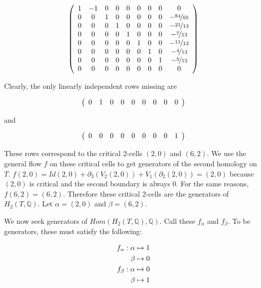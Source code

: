 \documentclass{amsart}
\newcommand{\bq}{\ensuremath{\mathbb{Q}}} %
\begin{document}
\bigskip

$$
\left(
\begin{array}{*{9}c}
1 & -1 & 0 & 0 & 0 & 0 & 0 & 0 & 0\\
0 & 0 & 1 & 0 & 0 & 0 & 0 & 0 & -\nicefrac{84}{65}\\
0 & 0 & 0 & 1 & 0 & 0 & 0 & 0 & -\nicefrac{21}{13}\\
0 & 0 & 0 & 0 & 1 & 0 & 0 & 0 & -\nicefrac{7}{13}\\
0 & 0 & 0 & 0 & 0 & 1 & 0 & 0 & -\nicefrac{11}{13}\\
0 & 0 & 0 & 0 & 0 & 0 & 1 & 0 & -\nicefrac{4}{13}\\
0 & 0 & 0 & 0 & 0 & 0 & 0 & 1 & -\nicefrac{5}{13}\\
0 & 0 & 0 & 0 & 0 & 0 & 0 & 0 & 0\\
\end{array}
\right)
$$
\bigskip

Clearly, the only linearly independent rows missing are 

$$
\left(
\begin{array}{*{9}c}
0 & 1 & 0 & 0 & 0 & 0 & 0 & 0 & 0
\end{array}
\right)
$$

and

$$
\left(
\begin{array}{*{9}c}
0 & 0 & 0 & 0 & 0 & 0 & 0 & 0 & 1
\end{array}
\right)
$$
\bigskip

These rows correspond to the critical 2-cells $(2,0)$ and $(6,2)$. We use the general flow $f$ on these critical cells to get generators of the second homology on $T$. $f(2,0) = Id(2,0) + \partial_{3}(V_{2}(2,0)) + V_{1}(\partial_{2}(2,0)) = (2,0)$ because $(2,0)$ is critical and the second boundary is always $0$. For the same reasons, $f(6,2) = (6,2)$. Therefore these critical 2-cells are the generators of $H_{2}(T, \bq)$. Let $\alpha = (2,0)$ and $\beta = (6,2)$. 

We now seek generators of $Hom(H_{2}(T, \bq), \bq)$. Call these $f_{\alpha}$ and $f_{\beta}$. To be generators, these must satisfy the following:

\begin{align*}
f_{\alpha} : \alpha \mapsto 1\\
\beta \mapsto 0\\
\bigskip
f_{\beta}: \alpha \mapsto 0\\
\beta \mapsto 1
\end{align*} 
\end{document}
